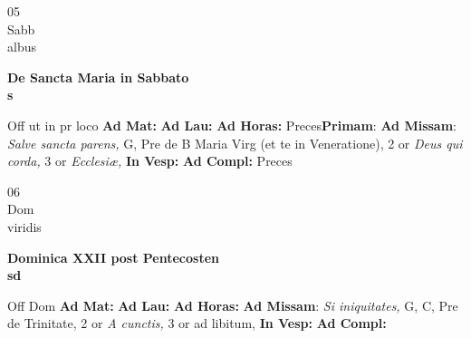 \documentclass[10pt, openany]{book}
\begin{document}
        \begin{center}
            \begin{minipage}{3.5in}
                \vspace{2em}
                \begin{minipage}{0.5in}
                    {\Huge 05} \\
                    {\normalsize Sabb} \\
                    {\normalsize albus}
                \end{minipage}
                \begin{minipage}{3.0in}
                    \textbf{ \large De Sancta Maria in Sabbato \\
                    \textnormal{\normalsize s}} \\ 
                \end{minipage}
                \begin{justify}Off ut in pr loco
                    \textbf{Ad Mat: }
                    \textbf{Ad Lau: }
                    \textbf{Ad Horas: }Preces\textbf{Primam}: \textbf{Ad Missam}: \textit{Salve sancta parens,} G, Pre de B Maria Virg (et te in Veneratione), 2 or \textit{Deus qui corda,} 3 or \textit{Ecclesiæ,}  
                    \textbf{In Vesp: }
                    \textbf{Ad Compl: }Preces
                \end{justify}
            \end{minipage}
        \end{center}
    
        \begin{center}
            \begin{minipage}{3.5in}
                \vspace{2em}
                \begin{minipage}{0.5in}
                    {\Huge 06} \\
                    {\normalsize Dom} \\
                    {\normalsize viridis}
                \end{minipage}
                \begin{minipage}{3.0in}
                    \textbf{ \large Dominica XXII post Pentecosten \\
                    \textnormal{\normalsize sd}} \\ 
                \end{minipage}
                \begin{justify}Off Dom
                    \textbf{Ad Mat: }
                    \textbf{Ad Lau: }
                    \textbf{Ad Horas: }\textbf{Ad Missam}: \textit{Si iniquitates,} G, C, Pre de Trinitate, 2 or \textit{A cunctis,} 3 or ad libitum,  
                    \textbf{In Vesp: }
                    \textbf{Ad Compl: }
                \end{justify}
            \end{minipage}
        \end{center}
    
\end{document}
